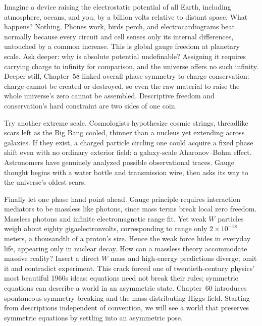 
\begin{thought}
Imagine a device raising the electrostatic potential of all Earth, including atmosphere, oceans, and you, by a billion volts relative to distant space. What happens? Nothing. Phones work, birds perch, and electrocardiograms beat normally because every circuit and cell senses only its internal differences, untouched by a common increase. This is global gauge freedom at planetary scale. Ask deeper: why is absolute potential undefinable? Assigning it requires carrying charge to infinity for comparison, and the universe offers no such infinity. Deeper still, Chapter~58 linked overall phase symmetry to charge conservation: charge cannot be created or destroyed, so even the raw material to raise the whole universe's zero cannot be assembled. Descriptive freedom and conservation's hard constraint are two sides of one coin.

Try another extreme scale. Cosmologists hypothesize cosmic strings, threadlike scars left as the Big Bang cooled, thinner than a nucleus yet extending across galaxies. If they exist, a charged particle circling one could acquire a fixed phase shift even with no ordinary exterior field: a galaxy-scale Aharonov--Bohm effect. Astronomers have genuinely analyzed possible observational traces. Gauge thought begins with a water bottle and transmission wire, then asks its way to the universe's oldest scars.
\end{thought}

\begin{mainline}
Finally let one phase hand point ahead. Gauge principle requires interaction mediators to be massless like photons, since mass terms break local zero freedom. Massless photons and infinite electromagnetic range fit. Yet weak \(W\) particles weigh about eighty gigaelectronvolts, corresponding to range only \(2\times10^{-18}\) meters, a thousandth of a proton's size. Hence the weak force hides in everyday life, appearing only in nuclear decay. How can a massless theory accommodate massive reality? Insert a direct \(W\) mass and high-energy predictions diverge; omit it and contradict experiment. This crack forced one of twentieth-century physics' most beautiful 1960s ideas: equations need not break their rules; symmetric equations can describe a world in an asymmetric state. Chapter~60 introduces spontaneous symmetry breaking and the mass-distributing Higgs field. Starting from descriptions independent of convention, we will see a world that preserves symmetric equations by settling into an asymmetric pose.
\end{mainline}

